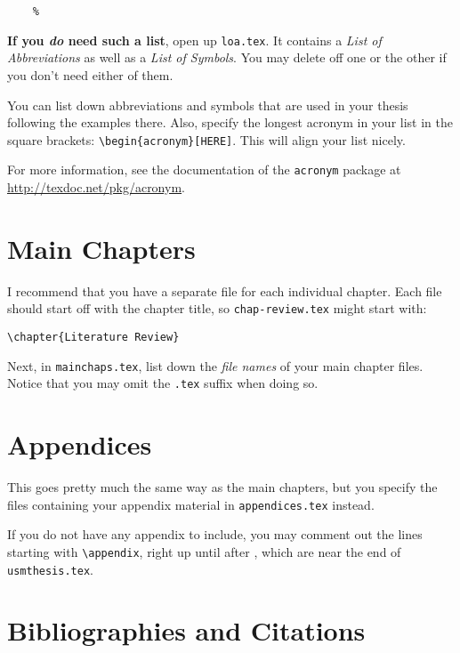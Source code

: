 \begin{lstlisting}
    %
\end{lstlisting}

\textbf{If you \emph{do} need such a list}, open up \texttt{loa.tex}. It contains a \textit{List of Abbreviations} as well as a \textit{List of Symbols}. You may delete off one or the other if you don't need either of them.

You can list down abbreviations and symbols that are used in your thesis following the examples there. Also, specify the longest acronym in your list in the square brackets: \lstinline|\begin{acronym}[HERE]|. This will align your list nicely.

For more information, see the documentation of the \texttt{acronym} package at \url{http://texdoc.net/pkg/acronym}.



\section{Main Chapters}

I recommend that you have a separate file for each individual chapter. Each file should start off with the chapter title, so \texttt{chap-review.tex} might start with:

\lstinline|\chapter{Literature Review}|

Next, in \texttt{mainchaps.tex}, list down the \emph{file names} of your main chapter files. Notice that you may omit the \texttt{.tex} suffix when doing so.



\section{Appendices}
This goes pretty much the same way as the main chapters, but you specify the files containing your appendix material in \texttt{appendices.tex} instead.

If you do not have any appendix to include, you may comment out the lines starting with \lstinline|\appendix|, right up until after \lstinline||, which are near the end of \texttt{usmthesis.tex}.


\section{Bibliographies and Citations}

